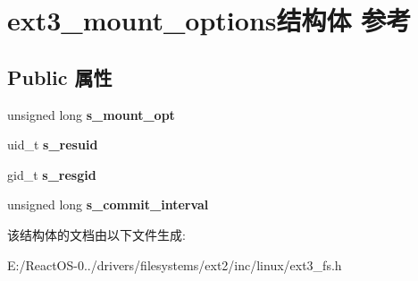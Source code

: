 \hypertarget{structext3__mount__options}{}\section{ext3\+\_\+mount\+\_\+options结构体 参考}
\label{structext3__mount__options}
\subsection*{Public 属性}
\begin{DoxyCompactItemize}
\item 
\mbox{\label{structext3__mount__options_a08ca2f71a971e339580a34b325e77966}} 
unsigned long {\bfseries s\+\_\+mount\+\_\+opt}
\item 
\mbox{\label{structext3__mount__options_ad7d6647ee2010bbc90d333af018a329f}} 
uid\+\_\+t {\bfseries s\+\_\+resuid}
\item 
\mbox{\label{structext3__mount__options_a8c8bcccdd042de8e469889302914a4a0}} 
gid\+\_\+t {\bfseries s\+\_\+resgid}
\item 
\mbox{\label{structext3__mount__options_a90ded9c85ee17b146940bbdd54211de4}} 
unsigned long {\bfseries s\+\_\+commit\+\_\+interval}
\end{DoxyCompactItemize}


该结构体的文档由以下文件生成\+:\begin{DoxyCompactItemize}
\item 
E\+:/\+React\+O\+S-\/0../drivers/filesystems/ext2/inc/linux/ext3\+\_\+fs.\+h\end{DoxyCompactItemize}
